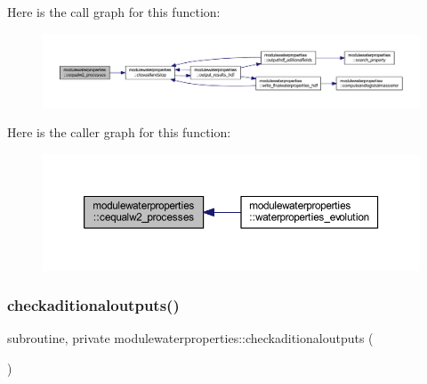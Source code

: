 Here is the call graph for this function\+:\nopagebreak
\begin{figure}[H]
\begin{center}
\leavevmode
\includegraphics[width=350pt]{namespacemodulewaterproperties_a77c662c86e2d882859f2a18d2cde59d1_cgraph}
\end{center}
\end{figure}
Here is the caller graph for this function\+:\nopagebreak
\begin{figure}[H]
\begin{center}
\leavevmode
\includegraphics[width=350pt]{namespacemodulewaterproperties_a77c662c86e2d882859f2a18d2cde59d1_icgraph}
\end{center}
\end{figure}
\mbox{\label{namespacemodulewaterproperties_aa08d6c50fcab3e8816fe7775bd101952}} 
\subsubsection{\texorpdfstring{checkaditionaloutputs()}{checkaditionaloutputs()}}
{\footnotesize\ttfamily subroutine, private modulewaterproperties\+::checkaditionaloutputs (\begin{DoxyParamCaption}{ }\end{DoxyParamCaption})\hspace{0.3cm}{\ttfamily [private]}}

